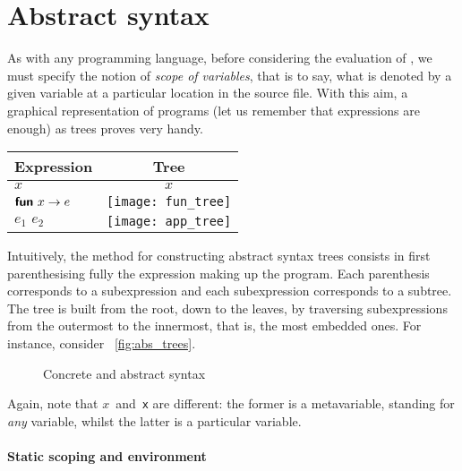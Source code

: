 \section*{Abstract syntax}

As with any programming language, before considering the evaluation of
\OCaml, we must specify the notion of \emph{scope of variables}, that
is to say, what is denoted by a given variable at a particular
location in the source file. With this aim, a graphical representation
of programs (let us remember that expressions are enough) as trees
proves very handy.
\begin{center}
\begin{tabular}{l|c}
\toprule
  \multicolumn{1}{c}{Expression}
& \multicolumn{1}{c}{Tree}\\
\toprule
    $x$
  & $x$\\
    $\textsf{\textbf{fun}} \,\, x \rightarrow e$
  & \texttt{[image: fun\_tree]}\\
    $e_1 \,\, e_2$ 
  & \texttt{[image: app\_tree]}\\
\bottomrule
\end{tabular}
\end{center}
Intuitively, the method for constructing abstract syntax trees
consists in first parenthesising fully the expression making up the
program. Each parenthesis corresponds to a subexpression and each
subexpression corresponds to a subtree. The tree is built from the
root, down to the leaves, by traversing subexpressions from the
outermost to the innermost, that is, the most embedded ones. For
instance, consider
\fig~\vref{fig:abs_trees}.
\begin{figure}
\centering
{}
\qquad
{}
\qquad
{}
\caption{Concrete and abstract syntax\label{fig:abs_trees}}
\end{figure}
Again, note that $x$~and~\texttt{x} are different: the former is a
metavariable, standing for \emph{any} \OCaml variable, whilst the
latter is a particular \OCaml variable.

\paragraph{Static scoping and environment}

